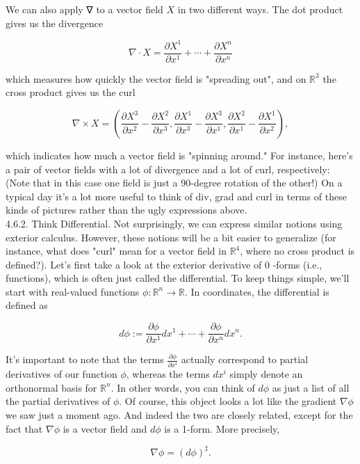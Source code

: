\documentclass[10pt]{article}
\begin{document}
We can also apply ∇ to a vector field $X$ in two different ways. The dot product gives us the divergence

$$
\nabla \cdot X=\frac{\partial X^{1}}{\partial x^{1}}+\cdots+\frac{\partial X^{n}}{\partial x^{n}}
$$

which measures how quickly the vector field is "spreading out", and on $\mathbb{R}^{3}$ the cross product gives us the curl

$$
\nabla \times X=\left(\frac{\partial X^{3}}{\partial x^{2}}-\frac{\partial X^{2}}{\partial x^{3}}, \frac{\partial X^{1}}{\partial x^{3}}-\frac{\partial X^{3}}{\partial x^{1}}, \frac{\partial X^{2}}{\partial x^{1}}-\frac{\partial X^{1}}{\partial x^{2}}\right),
$$

which indicates how much a vector field is "spinning around." For instance, here's a pair of vector fields with a lot of divergence and a lot of curl, respectively:\\
(Note that in this case one field is just a 90-degree rotation of the other!) On a typical day it's a lot more useful to think of div, grad and curl in terms of these kinds of pictures rather than the ugly expressions above.\\
4.6.2. Think Differential. Not surprisingly, we can express similar notions using exterior calculus. However, these notions will be a bit easier to generalize (for instance, what does "curl" mean for a vector field in $\mathbb{R}^{4}$, where no cross product is defined?). Let's first take a look at the exterior derivative of 0 -forms (i.e., functions), which is often just called the differential. To keep things simple, we'll start with real-valued functions $\phi: \mathbb{R}^{n} \rightarrow \mathbb{R}$. In coordinates, the differential is defined as

$$
d \phi:=\frac{\partial \phi}{\partial x^{1}} d x^{1}+\cdots+\frac{\partial \phi}{\partial x^{n}} d x^{n} .
$$

It's important to note that the terms $\frac{\partial \phi}{\partial x^{i}}$ actually correspond to partial derivatives of our function $\phi$, whereas the terms $d x^{i}$ simply denote an orthonormal basis for $\mathbb{R}^{n}$. In other words, you can think of $d \phi$ as just a list of all the partial derivatives of $\phi$. Of course, this object looks a lot like the gradient $\nabla \phi$ we saw just a moment ago. And indeed the two are closely related, except for the fact that $\nabla \phi$ is a vector field and $d \phi$ is a 1-form. More precisely,

$$
\nabla \phi=(d \phi)^{\sharp} .
$$
\end{document}
